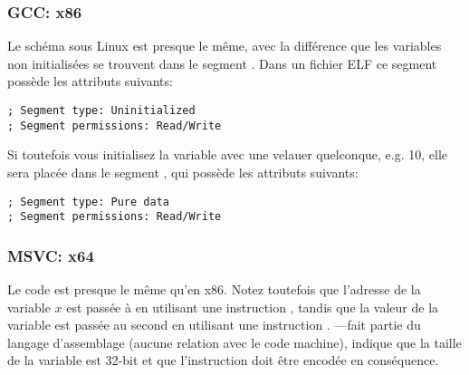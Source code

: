 \subsubsection{GCC: x86}

Le schéma sous Linux est presque le même, avec la différence que les variables
non initialisées se trouvent dans le segment .
Dans un fichier \ac{ELF} ce segment possède les attributs suivants:

\begin{lstlisting}
; Segment type: Uninitialized
; Segment permissions: Read/Write
\end{lstlisting}

Si toutefois vous initialisez la variable avec une velauer quelconque, e.g. 10,
elle sera placée dans le segment , qui possède les attributs suivants:

\begin{lstlisting}
; Segment type: Pure data
; Segment permissions: Read/Write
\end{lstlisting}

\subsubsection{MSVC: x64}



Le code est presque le même qu'en x86.
Notez toutefois que l'adresse de la variable $x$ est passée à  en utilisant
une instruction \LEA, tandis que la valeur de la variable est passée au second \printf
en utilisant une instruction \MOV.
---fait partie du langage d'assemblage (aucune relation avec le code machine),
indique que la taille de la variable est 32-bit et que l'instruction \MOV doit être
encodée en conséquence.

